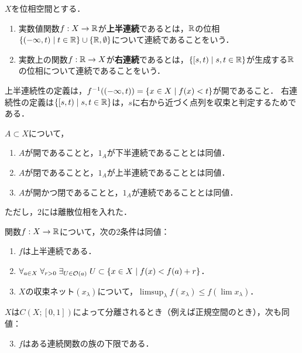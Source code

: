 \documentclass[uplatex,dvipdfmx]{jsreport}
\begin{document}
\begin{definition}
    $X$を位相空間とする．
    \begin{enumerate}
        \item 実数値関数$f:X\to\mathbb{R}$が\textbf{上半連続}であるとは，$\mathbb{R}$の位相$\{(-\infty,t)\mid t\in\mathbb{R}\}\cup\{\mathbb{R},\emptyset\}$について連続であることをいう．
        \item 実数上の関数$f:\mathbb{R}\to X$が\textbf{右連続}であるとは，$\left\{[s,t)\mid s,t\in\mathbb{R}\right\}$が生成する$\mathbb{R}$の位相について連続であることをいう．
    \end{enumerate}
\end{definition}
\begin{remark}
    上半連続性の定義は，$f^{-1}((-\infty,t))=\left\{x\in X\mid f(x)<t\right\}$が開であること．
    右連続性の定義は$\left\{[s,t)\mid s,t\in\mathbb{R}\right\}$は，$s$に右から近づく点列を収束と判定するためである．
\end{remark}

\begin{proposition}[特性関数の連続性]
    $A\subset X$について，
    \begin{enumerate}
        \item $A$が開であることと，$1_A$が下半連続であることとは同値．
        \item $A$が閉であることと，$1_A$が上半連続であることとは同値．
        \item $A$が開かつ閉であることと，$1_A$が連続であることとは同値．
    \end{enumerate}
    ただし，$2$には離散位相を入れた．
\end{proposition}

\begin{proposition}[上半連続性の特徴付け]
    関数$f:X\to\mathbb{R}$について，次の2条件は同値：
    \begin{enumerate}
        \item $f$は上半連続である．
        \item $\forall_{a\in X}\;\forall_{r>0}\;\exists_{U\in\mathcal{O}(a)}\;U\subset\left\{x\in X\mid f(x)<f(a)+r\right\}$．
        \item $X$の収束ネット$(x_\lambda)$について，$\limsup_\lambda f(x_\lambda)\le f(\lim x_\lambda)$．
    \end{enumerate}
    $X$は$C(X;[0,1])$によって分離されるとき（例えば正規空間のとき），次も同値：
    \begin{enumerate}\setcounter{enumi}{2}
        \item $f$はある連続関数の族の下限である．
    \end{enumerate}
\end{proposition}
\end{document}
